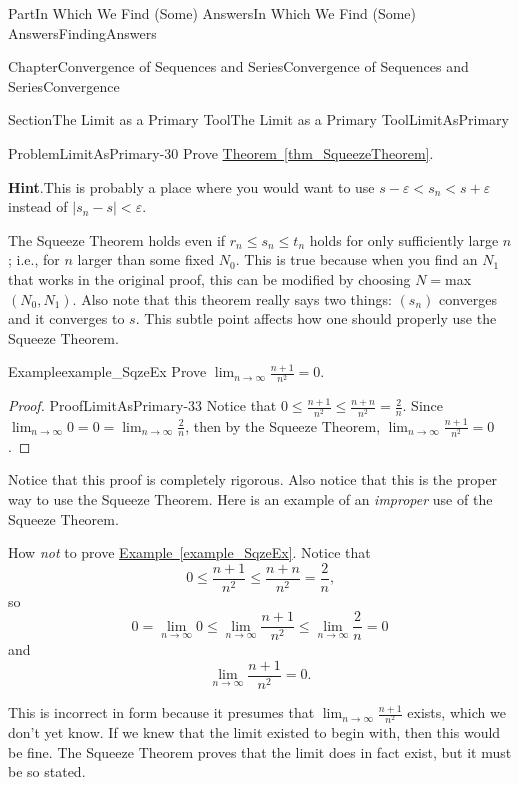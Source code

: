 \documentclass[oneside,10pt,]{book}
\newcommand{\blocktitlefont}{\relax}
\newcommand{\xreffont}{\relax}
\numberwithin{equation}{part}
\newcommand{\eps}{\varepsilon}
\newcommand{\lt}{<}
\begin{document}
\begin{partptx}{Part}{In Which We Find (Some) Answers}{}{In Which We Find (Some) Answers}{}{}{FindingAnswers}
\begin{chapterptx}{Chapter}{Convergence of Sequences and Series}{}{Convergence of Sequences and Series}{}{}{Convergence}
\begin{sectionptx}{Section}{The Limit as a Primary Tool}{}{The Limit as a Primary Tool}{}{}{LimitAsPrimary}
\begin{problem}{Problem}{}{LimitAsPrimary-30}%
Prove \hyperref[thm_SqueezeTheorem]{Theorem~{\xreffont\ref{thm_SqueezeTheorem}}}.%
\par\smallskip%
\noindent\textbf{\blocktitlefont Hint}.\hypertarget{LimitAsPrimary-30-3}{}\quad{}This is probably a place where you would want to use \(s-\eps\lt s_n\lt s+\eps\) instead of \(|s_n-s|\lt
\eps\).%
\end{problem}
The Squeeze Theorem holds even if \(r_n\leq s_n\leq t_n\) holds for only sufficiently large \(n\); i.e., for \(n\) larger than some fixed \(N_0\). This is true because when you find an \(N_1\) that works in the original proof, this can be modified by choosing \(N=\)max\(\left(N_0,N_1\right)\). Also note that this theorem really says two things: \(\left(s_n\right)\) converges and it converges to \(s\). This subtle point affects how one should properly use the Squeeze Theorem.%
\begin{example}{Example}{}{example_SqzeEx}%
Prove \(\displaystyle\lim_{n\rightarrow\infty}\frac{n+1}{n^2}=0\).%
\end{example}
\begin{proof}{Proof}{}{LimitAsPrimary-33}
Notice that \(0\leq\frac{n+1}{n^2}\leq\frac{n+n}{n^2}=\frac{2}{n}\). Since \(\displaystyle\lim_{n\rightarrow\infty}0=0=\lim_{n\rightarrow\infty}\frac{2}{n}\), then by the Squeeze Theorem, \(\displaystyle\lim_{n\rightarrow\infty}\frac{n+1}{n^2}=0\).%
\end{proof}
Notice that this proof is completely rigorous. Also notice that this is the proper way to use the Squeeze Theorem. Here is an example of an \emph{improper} use of the Squeeze Theorem.%
\par
How \emph{not} to prove \hyperref[example_SqzeEx]{Example~{\xreffont\ref{example_SqzeEx}}}. Notice that%
\begin{equation*}
0\leq\frac{n+1}{n^2}\leq\frac{n+n}{n^2}=\frac{2}{n}\text{,}
\end{equation*}
so%
\begin{equation*}
0=\lim_{n\rightarrow\infty}0 \leq \lim_{n\rightarrow\infty}\frac{n+1}{n^2}\leq\lim_{n\rightarrow\infty}\frac{2}{n}=0
\end{equation*}
and%
\begin{equation*}
\lim_{n\rightarrow\infty}\frac{n+1}{n^2}=0\text{.}
\end{equation*}
%
\par
This is incorrect in form because it presumes that \(\lim_{n\rightarrow\infty}\frac{n+1}{n^2}\) exists, which we don't yet know. If we knew that the limit existed to begin with, then this would be fine. The Squeeze Theorem proves that the limit does in fact exist, but it must be so stated.%

\end{sectionptx}
\end{chapterptx}
\end{partptx}
\end{document}
